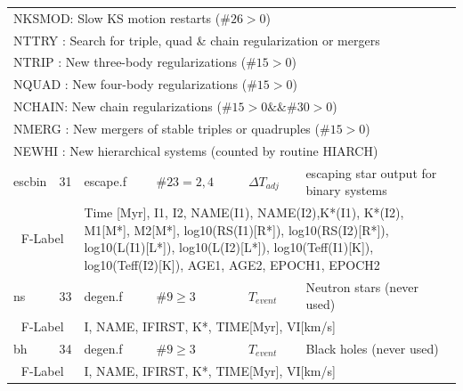 \begin{longtable}{||p{0.42in}|p{0.25in}|p{0.6in}|p{0.6in}|p{0.4in}|p{2.3in}||}
\multicolumn{6}{|p{5.4in}|}{ NKSMOD: Slow KS motion restarts ($\#26>0$)}\\
\multicolumn{6}{|p{5.4in}|}{ NTTRY : Search for triple, quad \& chain regularization or mergers}\\
\multicolumn{6}{|p{5.4in}|}{ NTRIP : New three-body regularizations ($\#15>0$)}\\
\multicolumn{6}{|p{5.4in}|}{ NQUAD : New four-body regularizations ($\#15>0$)}\\
\multicolumn{6}{|p{5.4in}|}{ NCHAIN: New chain regularizations ($\#15>0\&\&\#30>0$)}\\
\multicolumn{6}{|p{5.4in}|}{ NMERG : New mergers of stable triples or quadruples ($\#15>0$)}\\
\multicolumn{6}{|p{5.4in}|}{ NEWHI : New hierarchical systems (counted by routine HIARCH)}\\
\hline\hline


  escbin     & 31  & escape.f    & $\#23=2, 4$   & $\Delta T_{ad j}$      & escaping star output for binary systems \\\hline
\multicolumn{2}{|c|}{ F-Label } & \multicolumn{4}{|p{4.4in}|}{ Time [Myr], I1, I2, NAME(I1), NAME(I2),K*(I1), K*(I2), M1[M*], M2[M*], log10(RS(I1)[R*]), log10(RS(I2)[R*]), log10(L(I1)[L*]), log10(L(I2)[L*]), log10(Teff(I1)[K]), log10(Teff(I2)[K]), AGE1, AGE2, EPOCH1, EPOCH2}\\\hline\hline


  ns       & 33  & degen.f    & $\#9\geq3$   & $T_{event}$    & Neutron stars (never used)    \\\hline
\multicolumn{2}{|c|}{ F-Label } & \multicolumn{4}{|p{4.4in}|}{ I, NAME, IFIRST, K*, TIME[Myr], VI[km/s] }\\\hline\hline

  bh       & 34  & degen.f    & $\#9\geq3$   & $T_{event}$    & Black holes (never used)      \\\hline
\multicolumn{2}{|c|}{ F-Label } & \multicolumn{4}{|p{4.4in}|}{ I, NAME, IFIRST, K*, TIME[Myr], VI[km/s] }\\\hline\hline


\end{longtable}
